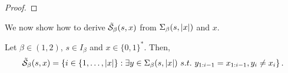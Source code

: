 \begin{proof}

\end{proof}

We now show how to derive $\tilde {\mathcal{S}}_\beta(s,x)$ from $\Sigma_\beta(s,\left| x \right|)$ and $x$.
\begin{lemma}\label{lem:characterization of the set of indices in the switch set by divergences in the tree of beta expansions}
    Let $\beta \in (1,2)$, $s \in I_\beta$ and $x \in \{0,1\}^\ast$. Then,
    \begin{equation}
        \tilde \SM_\beta(s,x) = \left\{ i \in \{1,\ldots, \len x\}: \exists y \in \Sigma_\beta(s,\len x) \ s.t. \ y_{1:i-1} = x_{1:i-1}, y_i \neq x_i \right\}.
    \end{equation}
\end{lemma}
